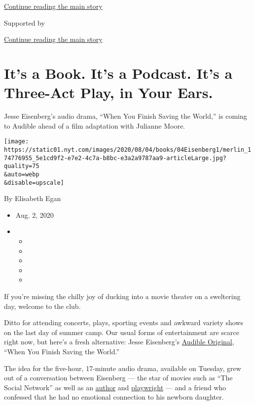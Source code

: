 \protect\hyperlink{after-top}{Continue reading the main story}

Supported by

\protect\hyperlink{after-sponsor}{Continue reading the main story}

\hypertarget{its-a-book-its-a-podcast-its-a-three-act-play-in-your-ears}{%
\section{It's a Book. It's a Podcast. It's a Three-Act Play, in Your
Ears.}\label{its-a-book-its-a-podcast-its-a-three-act-play-in-your-ears}}

Jesse Eisenberg's audio drama, ``When You Finish Saving the World,'' is
coming to Audible ahead of a film adaptation with Julianne Moore.

\texttt{[image: https://static01.nyt.com/images/2020/08/04/books/04Eisenberg1/merlin\_174776955\_5e1cd9f2-e7e2-4c7a-b8bc-e3a2a9787aa9-articleLarge.jpg?quality=75\\\&auto=webp\\\&disable=upscale]}

By Elisabeth Egan

\begin{itemize}
\item
  Aug. 2, 2020
\item
  \begin{itemize}
  \item
  \item
  \item
  \item
  \item
  \end{itemize}
\end{itemize}

If you're missing the chilly joy of ducking into a movie theater on a
sweltering day, welcome to the club.

Ditto for attending concerts, plays, sporting events and awkward variety
shows on the last day of summer camp. Our usual forms of entertainment
are scarce right now, but here's a fresh alternative: Jesse Eisenberg's
\href{https://www.nytimes.com/2018/12/06/books/curtis-sittenfeld-audible-original.html}{Audible
Original}, ``When You Finish Saving the World.''

The idea for the five-hour, 17-minute audio drama, available on Tuesday,
grew out of a conversation between Eisenberg --- the star of movies such
as ``The Social Network'' as well as an
\href{https://www.nytimes.com/2015/09/06/books/review/jesse-eisenberg-by-the-book.html}{author}
and
\href{https://www.nytimes.com/2015/06/03/theater/review-the-spoils-stars-jesse-eisenberg-as-narcissist.html}{playwright}
--- and a friend who confessed that he had no emotional connection to
his newborn daughter.

